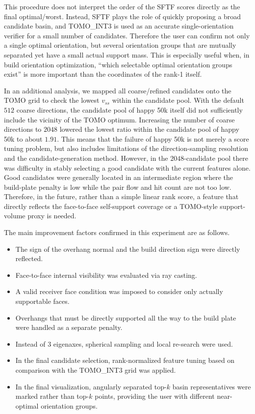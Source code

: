 \documentclass[11pt,a4paper]{article}
\begin{document}
This procedure does not interpret the order of the SFTF scores directly as the final optimal/worst.
Instead, SFTF plays the role of quickly proposing a broad candidate basin,
and TOMO\_INT3 is used as an accurate single-orientation verifier for a small number of candidates.
Therefore the user can confirm not only a single optimal orientation, but
several orientation groups that are mutually separated yet have a small actual support mass.
This is especially useful when, in build orientation optimization, ``which selectable optimal orientation groups exist''
is more important than the coordinates of the rank-1 itself.

In an additional analysis, we mapped all coarse/refined candidates onto the TOMO grid to check the lowest $v_{ss}$ within the candidate pool.
With the default $512$ coarse directions, the candidate pool of happy 50k itself did not sufficiently include the vicinity of the TOMO optimum.
Increasing the number of coarse directions to $2048$ lowered the lowest ratio within the candidate pool of happy 50k to about $1.91$.
This means that the failure of happy 50k is not merely a score tuning problem, but
also includes limitations of the direction-sampling resolution and the candidate-generation method.
However, in the $2048$-candidate pool there was difficulty in stably selecting a good candidate with the current features alone.
Good candidates were generally located in an intermediate region where the build-plate penalty is low while
the pair flow and hit count are not too low.
Therefore, in the future, rather than a simple linear rank score,
a feature that directly reflects the face-to-face self-support coverage or a TOMO-style support-volume proxy is needed.

The main improvement factors confirmed in this experiment are as follows.

\begin{itemize}
\item The sign of the overhang normal and the build direction sign were directly reflected.
\item Face-to-face internal visibility was evaluated via ray casting.
\item A valid receiver face condition was imposed to consider only actually supportable faces.
\item Overhangs that must be directly supported all the way to the build plate were handled as a separate penalty.
\item Instead of 3 eigenaxes, spherical sampling and local re-search were used.
\item In the final candidate selection, rank-normalized feature tuning based on comparison with the TOMO\_INT3 grid was applied.
\item In the final visualization, angularly separated top-$k$ basin representatives were marked rather than top-$k$ points,
providing the user with different near-optimal orientation groups.
\end{itemize}
\end{document}

